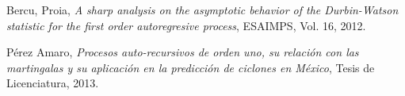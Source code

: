 \documentclass{siep}
\begin{document}

\begin{thebibliography}{99}

 Bercu, Proia, {\em A sharp analysis on the asymptotic behavior of the Durbin-Watson statistic for the first order autoregresive process}, ESAIMPS, Vol. 16, 2012.

 P\'erez Amaro, {\em Procesos auto-recursivos de orden uno, su relaci\'on con las martingalas y su aplicaci\'on en la predicci\'on de ciclones en M\'exico}, Tesis de Licenciatura, 2013.

\end{thebibliography}

%








\end{document}
